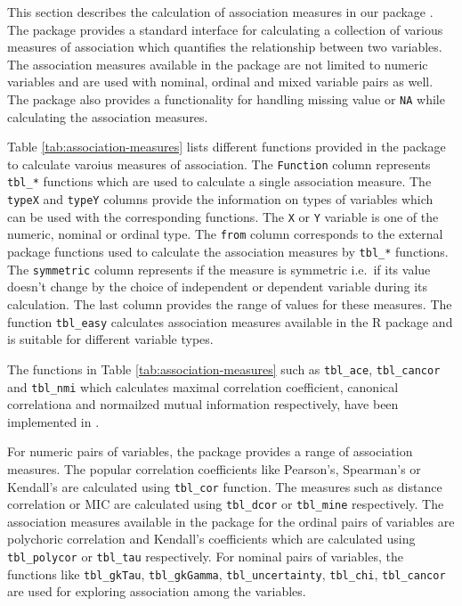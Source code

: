This section describes the calculation of association measures in our
package . The package provides a standard interface for
calculating a collection of various measures of association which
quantifies the relationship between two variables. The association
measures available in the package are not limited to numeric variables
and are used with nominal, ordinal and mixed variable pairs as well. The
package also provides a functionality for handling missing value or
\texttt{NA} while calculating the association measures.

Table \ref{tab:association-measures} lists different functions provided
in the package to calculate varoius measures of association. The
\texttt{Function} column represents \texttt{tbl\_*} functions which are
used to calculate a single association measure. The \texttt{typeX} and
\texttt{typeY} columns provide the information on types of variables
which can be used with the corresponding functions. The \texttt{X} or
\texttt{Y} variable is one of the numeric, nominal or ordinal type. The
\texttt{from} column corresponds to the external package functions used
to calculate the association measures by \texttt{tbl\_*} functions. The
\texttt{symmetric} column represents if the measure is symmetric i.e.~if
its value doesn't change by the choice of independent or dependent
variable during its calculation. The last column provides the range of
values for these measures. The function \texttt{tbl\_easy} calculates
association measures available in the R package 
and is suitable for different variable types.

The functions in Table \ref{tab:association-measures} such as
\texttt{tbl\_ace}, \texttt{tbl\_cancor} and \texttt{tbl\_nmi} which
calculates maximal correlation coefficient, canonical correlationa and
normailzed mutual information respectively, have been implemented in
.

For numeric pairs of variables, the package provides a range of
association measures. The popular correlation coefficients like
Pearson's, Spearman's or Kendall's are calculated using
\texttt{tbl\_cor} function. The measures such as distance correlation or
MIC are calculated using \texttt{tbl\_dcor} or \texttt{tbl\_mine}
respectively. The association measures available in the package for the
ordinal pairs of variables are polychoric correlation and Kendall's
coefficients which are calculated using \texttt{tbl\_polycor} or
\texttt{tbl\_tau} respectively. For nominal pairs of variables, the
functions like \texttt{tbl\_gkTau}, \texttt{tbl\_gkGamma},
\texttt{tbl\_uncertainty}, \texttt{tbl\_chi}, \texttt{tbl\_cancor} are
used for exploring association among the variables.

